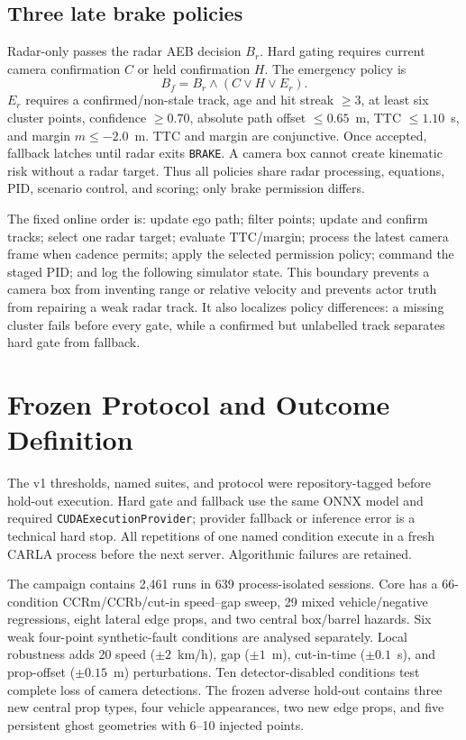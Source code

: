 \documentclass[conference]{IEEEtran}
\begin{document}
\subsection{Three late brake policies}
Radar-only passes the radar AEB decision $B_r$. Hard gating requires current
camera confirmation $C$ or held confirmation $H$. The emergency policy is
\begin{equation}
 B_f=B_r\land(C\lor H\lor E_r).
\end{equation}
$E_r$ requires a confirmed/non-stale track, age and hit streak $\geq3$, at
least six cluster points, confidence $\geq0.70$, absolute path offset
$\leq0.65$~m, TTC $\leq1.10$~s, and margin $m\leq-2.0$~m. TTC and margin are
conjunctive. Once accepted, fallback latches until radar exits \texttt{BRAKE}.
A camera box cannot create kinematic risk without a radar target. Thus all
policies share radar processing, equations, PID, scenario control, and scoring;
only brake permission differs.

The fixed online order is: update ego path; filter points; update and confirm
tracks; select one radar target; evaluate TTC/margin; process the latest camera
frame when cadence permits; apply the selected permission policy; command the
staged PID; and log the following simulator state. This boundary prevents a
camera box from inventing range or relative velocity and prevents actor truth
from repairing a weak radar track. It also localizes policy differences: a
missing cluster fails before every gate, while a confirmed but unlabelled track
separates hard gate from fallback.

\section{Frozen Protocol and Outcome Definition}
The v1 thresholds, named suites, and protocol were repository-tagged before
hold-out execution. Hard gate and fallback use the same ONNX model and required
\texttt{CUDAExecutionProvider}; provider fallback or inference error is a
technical hard stop. All repetitions of one named condition execute in a fresh
CARLA process before the next server. Algorithmic failures are retained.

The campaign contains 2,461 runs in 639 process-isolated sessions. Core has a
66-condition CCRm/CCRb/cut-in speed--gap sweep, 29 mixed vehicle/negative
regressions, eight lateral edge props, and two central box/barrel hazards. Six
weak four-point synthetic-fault conditions are analysed separately. Local
robustness adds 20 speed ($\pm2$~km/h), gap ($\pm1$~m), cut-in-time
($\pm0.1$~s), and prop-offset ($\pm0.15$~m) perturbations. Ten detector-disabled
conditions test complete loss of camera detections. The frozen adverse hold-out
contains three new central prop types, four vehicle appearances, two new edge
props, and five persistent ghost geometries with 6--10 injected points.
\end{document}
